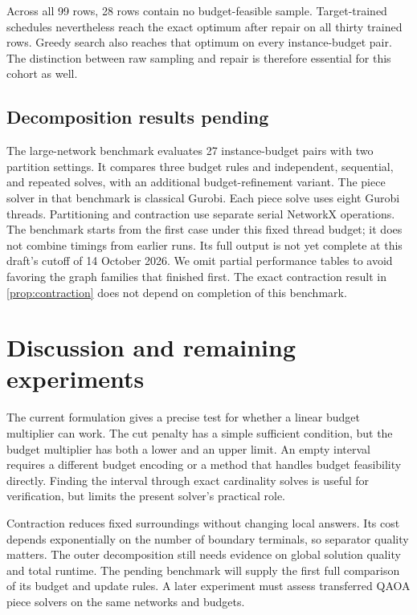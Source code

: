 \documentclass[review,onefignum,onetabnum]{siamart171218}
\begin{document}


Across all 99 rows, 28 rows contain no budget-feasible sample.
Target-trained schedules nevertheless reach the exact optimum after repair on all thirty trained rows.
Greedy search also reaches that optimum on every instance-budget pair.
The distinction between raw sampling and repair is therefore essential for this cohort as well.

\subsection{Decomposition results pending}
The large-network benchmark evaluates 27 instance-budget pairs with two partition settings.
It compares three budget rules and independent, sequential, and repeated solves, with an additional budget-refinement variant.
The piece solver in that benchmark is classical Gurobi.
Each piece solve uses eight Gurobi threads.
Partitioning and contraction use separate serial NetworkX operations.
The benchmark starts from the first case under this fixed thread budget; it does not combine timings from earlier runs.
Its full output is not yet complete at this draft's cutoff of 14 October 2026.
We omit partial performance tables to avoid favoring the graph families that finished first.
The exact contraction result in \cref{prop:contraction} does not depend on completion of this benchmark.

\section{Discussion and remaining experiments}\label{sec:discussion}
The current formulation gives a precise test for whether a linear budget multiplier can work.
The cut penalty has a simple sufficient condition, but the budget multiplier has both a lower and an upper limit.
An empty interval requires a different budget encoding or a method that handles budget feasibility directly.
Finding the interval through exact cardinality solves is useful for verification, but limits the present solver's practical role.

Contraction reduces fixed surroundings without changing local answers.
Its cost depends exponentially on the number of boundary terminals, so separator quality matters.
The outer decomposition still needs evidence on global solution quality and total runtime.
The pending benchmark will supply the first full comparison of its budget and update rules.
A later experiment must assess transferred QAOA piece solvers on the same networks and budgets.
\end{document}

